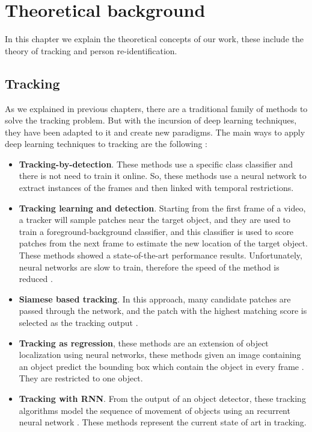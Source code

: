 \chapter{Theoretical background}\label{cap.theoretic}

In this chapter we explain the theoretical concepts of our work, these include the theory of tracking and person re-identification.

\section{Tracking}


As we explained in previous chapters, there are a traditional family of methods to solve the tracking problem. But with the incursion of deep learning techniques, they have been adapted to it and create new paradigms. The main ways to apply deep learning techniques to tracking are the following \cite{thrun}:


\begin{itemize}


\item \textbf{Tracking-by-detection}. These methods use a specific class classifier and there is not need to train it online. So, these methods use a neural network to extract instances of the frames and then linked with temporal restrictions. 

\item \textbf{Tracking learning and detection}. Starting from the first frame of a video, a tracker will sample patches near the target object, and they are used to train a foreground-background  classifier, and this classifier is used to score patches from the next frame to estimate the new location of the target object. These methods showed a state-of-the-art performance results. Unfortunately, neural networks are slow to train, therefore the speed of the method is reduced \cite{deep1} \cite{deep2}.


\item \textbf{Siamese based tracking}. In this approach, many candidate patches are passed through the network, and the patch with the highest matching score is selected as the tracking output \cite{trackingSiamese}.


\item \textbf{Tracking as regression}, these methods are an extension of object localization using neural networks, these methods given an image containing an object predict the bounding box which contain the object in every frame \cite{thrun}. They are restricted to one object.


\item \textbf{Tracking with RNN}. From the output of an object detector, these tracking algorithms model the sequence of movement of objects using an recurrent neural network \cite{savaresee}. These methods represent the current state of art in tracking.


\end{itemize}



